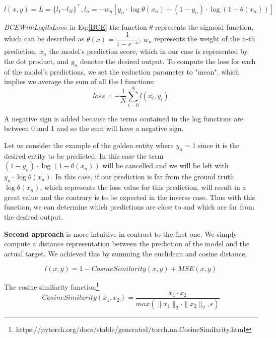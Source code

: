 \begin{equation}
\label{BCE}
l(x, y) = L = {\{l_{1} \cdots l_{N}\}}^{\top}, l_{n} = -w_{n} [y_{n} \cdot \log\theta(x_{n}) + (1-y_{n}) \cdot \log(1-\theta(x_{n}))]
\end{equation} 

\textit{BCEWithLogitsLoss}: in Eq:\ref{BCE} the function $\theta$ represents the sigmoid function, which can be described as $\theta(x) = \dfrac{1}{1-e^{-x}}$, $w_{n}$ represents the weight of the n-th prediction, $x_{n}$ the model's prediction score, which in our case is represented by the dot product, and $y_{n}$ denotes the desired output. To compute the loss for each of the model's predictions, we set the reduction parameter to "mean", which implies we average the sum of all the l functions: \newline
\begin{equation}
\label{BCESum}
loss =  -\dfrac{1}{N}\sum_{i=0}^N l(x_{i}, y_{i})
\end{equation} 

A negative sign is added because the terms contained in the log functions are between 0 and 1 and so the sum will have a negative sign.\newline

Let us consider the example of the golden entity where $y_{n} = 1$ since it is the desired entity to be predicted. In this case the term $(1-y_{n}) \cdot \log(1-\theta(x_{n}))$ will be cancelled and we will be left with $y_{n} \cdot \log\theta(x_{n})$. In this case, if our prediction is far from the ground truth $\log\theta(x_{n})$, which represents the loss value for this prediction, will result in a great value and the contrary is to be expected in the inverse case.\newline 
Thus with this function, we can determine which predictions are close to and which are far from the desired output.

\textbf{Second approach} is more intuitive in contrast to the first one. We simply compute a distance representation between the prediction of the model and the actual target. We achieved this by summing the euclidean and cosine distance,

\begin{equation}
\label{cos+mse}
l(x, y) = 1 - CosineSimilarity(x, y) + MSE(x, y)
\end{equation}

The cosine similarity function\footnote{https://pytorch.org/docs/stable/generated/torch.nn.CosineSimilarity.html} $$CosineSimilarity(x_{1}, x_{2}) = \dfrac{x_{1} \cdot x_{2}}{max(\|x_{1}\|_{2} \cdot \|x_{2}\|_{2}, \epsilon)}$$

